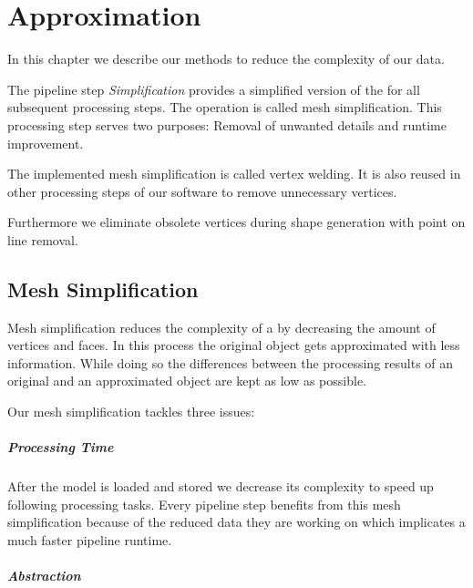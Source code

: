 \documentclass[../ClassicThesis.tex]{subfiles}
\begin{document}
\chapter{Approximation}\label{ch:approximation}

\newcommand\myNotes[1]{\textcolor{red}{#1}}


In this chapter we describe our methods to reduce the complexity of our data.

The pipeline step \emph{Simplification} provides a simplified version of the {\threedmodel} for all subsequent processing steps. The operation is called mesh simplification. This processing step serves two purposes: Removal of unwanted details and runtime improvement.

The implemented mesh simplification is called vertex welding. It is also reused in other processing steps of our software to remove unnecessary vertices.

Furthermore we eliminate obsolete vertices during shape generation with point on line removal.


\section{Mesh Simplification}


Mesh simplification reduces the complexity of a {\threedmodel} by decreasing the amount of vertices and faces. In this process the original object gets approximated with less information. While doing so the differences between the processing results of an original and an approximated object are kept as low as possible.

Our mesh simplification tackles three issues:

\paragraph*{Processing Time}

After the model is loaded and stored we decrease its complexity to speed up following processing tasks. Every pipeline step benefits from this mesh simplification because of the reduced data they are working on which implicates a much faster pipeline runtime.

\paragraph*{Abstraction}
\end{document}
